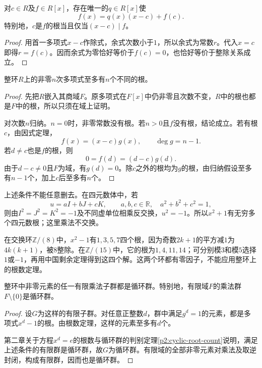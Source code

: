 \begin{corollary}
对$c\in R$及$f\in R[x]$，存在唯一的$q\in R[x]$使
\[
f(x)=q(x)(x-c)+f(c).
\]
特别地，$c$是$f$的根当且仅当$(x-c)\mid f$。
\end{corollary}
\begin{proof}
用首一多项式$x-c$作除式，余式次数小于$1$，所以余式为常数$r$。代入$x=c$即得$r=f(c)$。因而余式为零恰好等价于$f(c)=0$，也恰好等价于整除关系成立。
\end{proof}

\begin{theorem}\label{p2:poly-roots}
整环$R$上的非零$n$次多项式至多有$n$个不同的根。
\end{theorem}
\begin{proof}
先把$R$嵌入其商域$F$。原多项式在$F[x]$中仍非零且次数不变，$R$中的根也都是$F$中的根，所以只须在域上证明。

对次数$n$归纳。$n=0$时，非零常数没有根。若$n>0$且$f$没有根，结论成立。若有根$c$，由因式定理，
\[
f(x)=(x-c)g(x),\qquad\deg g=n-1.
\]
若$d\ne c$也是$f$的根，则
\[
0=f(d)=(d-c)g(d).
\]
由于$d-c\ne0$且$F$为域，有$g(d)=0$。除$c$之外的根均为$g$的根，由归纳假设至多有$n-1$个，加上$c$后至多有$n$个。
\end{proof}

\begin{example}
上述条件不能任意删去。在四元数体中，若
\[
u=aI+bJ+cK,\qquad a,b,c\in\mathbb R,\quad a^2+b^2+c^2=1,
\]
则由$I^2=J^2=K^2=-1$及不同虚单位相乘反交换，$u^2=-1$。所以$x^2+1$有无穷多个四元数根；这里乘法不交换。

在交换环$\mathbb Z/(8)$中，$x^2-1$有$1,3,5,7$四个根，因为奇数$2k+1$的平方减$1$为$4k(k+1)$，被$8$整除。在$\mathbb Z/(15)$中，它的根为$1,4,11,14$；可分别模$3$和模$5$选择$1$或$-1$，再用中国剩余定理得到这四个解。这两个环都有零因子，不能应用整环上的根数定理。
\end{example}

\begin{theorem}\label{p2:finite-multiplicative-subgroup}
整环中非零元素的任一有限乘法子群都是循环群。特别地，有限域$F$的乘法群$F\setminus\{0\}$是循环群。
\end{theorem}
\begin{proof}
设$G$为这样的有限子群。对任意正整数$d$，群中满足$g^d=1$的元素，都是多项式$x^d-1$的根。由根数定理，这样的元素至多有$d$个。

第二章关于方程$x^d=e$的根数与循环群的判别定理\ref{p2:cyclic-root-count}说明，满足上述条件的有限群是循环群，故$G$为循环群。有限域的全部非零元素对乘法及取逆封闭，构成有限群，因而也是循环群。
\end{proof}

